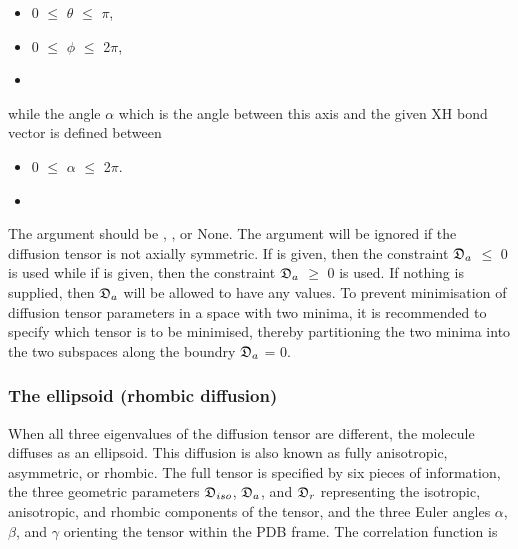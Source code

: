  \begin{itemize} 
 \item[] 0 $\le$ $\theta$ $\le$ $\pi$,  
 \item[] 0 $\le$ $\phi$ $\le$ 2$\pi$,  
 \item[]  
 \end{itemize} 
  

 while the angle $\alpha$ which is the angle between this axis and the given XH bond vector is defined between 
  

 \begin{itemize} 
 \item[] 0 $\le$ $\alpha$ $\le$ 2$\pi$.  
 \item[]  
 \end{itemize} 
  

 The  argument should be , , or None.  The argument will be ignored if the diffusion tensor is not axially symmetric.  If  is given, then the constraint $\mathfrak{D}_a$ $\le$ 0 is used while if  is given, then the constraint $\mathfrak{D}_a$ $\ge$ 0 is used.  If nothing is supplied, then $\mathfrak{D}_a$ will be allowed to have any values.  To prevent minimisation of diffusion tensor parameters in a space with two minima, it is recommended to specify which tensor is to be minimised, thereby partitioning the two minima into the two subspaces along the boundry $\mathfrak{D}_a$ = 0. 
  

  
 \subsubsection{The ellipsoid (rhombic diffusion)} 

 When all three eigenvalues of the diffusion tensor are different, the molecule diffuses as an ellipsoid.  This diffusion is also known as fully anisotropic, asymmetric, or rhombic. The full tensor is specified by six pieces of information, the three geometric parameters $\mathfrak{D}_{iso}$, $\mathfrak{D}_a$, and $\mathfrak{D}_r$ representing the isotropic, anisotropic, and rhombic components of the tensor, and the three Euler angles $\alpha$, $\beta$, and $\gamma$ orienting the tensor within the PDB frame.  The correlation function is 
  

